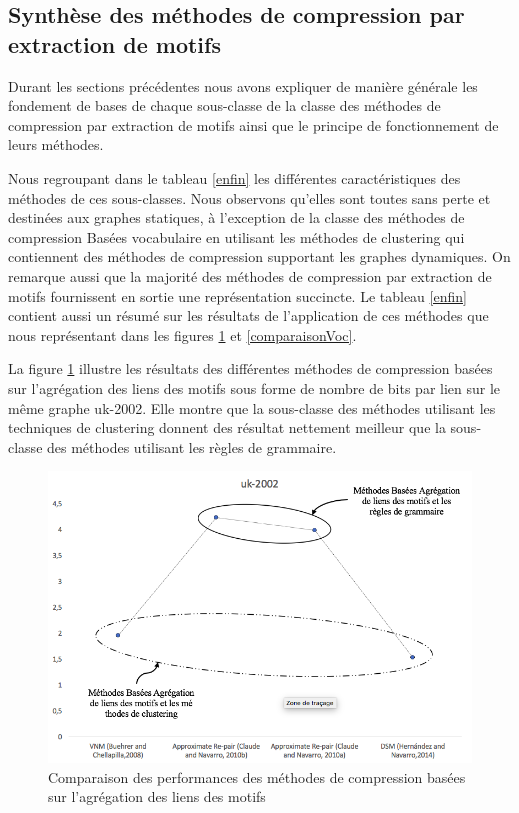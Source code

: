 \subsection{Synthèse des méthodes de compression par extraction de motifs }

	Durant les sections précédentes nous avons expliquer de manière générale les fondement de bases de chaque sous-classe de la classe des méthodes de compression par extraction de motifs ainsi que le principe de fonctionnement de leurs méthodes. 
	
	Nous regroupant dans le tableau \ref{enfin} les différentes caractéristiques des méthodes de ces sous-classes. Nous observons qu'elles sont toutes sans perte et destinées aux graphes statiques, à l'exception de la classe des méthodes de compression Basées vocabulaire en utilisant les méthodes de clustering qui contiennent des méthodes de compression supportant les graphes dynamiques. On remarque aussi que la majorité des méthodes de compression par extraction de motifs fournissent en sortie une représentation succincte. Le tableau \ref{enfin} contient aussi un résumé sur les résultats de l'application de ces méthodes que nous représentant dans les figures \ref{comparaison} et \ref{comparaisonVoc}.
	
	La figure \ref{comparaison} illustre les résultats des différentes méthodes de compression basées sur l'agrégation des liens des motifs sous forme de nombre de bits par lien sur le même graphe uk-2002. Elle montre que la sous-classe des méthodes utilisant les techniques de clustering donnent des résultat nettement meilleur que la sous-classe des méthodes utilisant les règles de grammaire.
	
								\begin{figure}[H]
					\includegraphics[scale=0.48]{ressources/image/edge.png} 
					\centering
					\caption{Comparaison des performances des méthodes de compression basées sur l'agrégation des liens des motifs}
					\label{comparaison}
				\end{figure}
				
